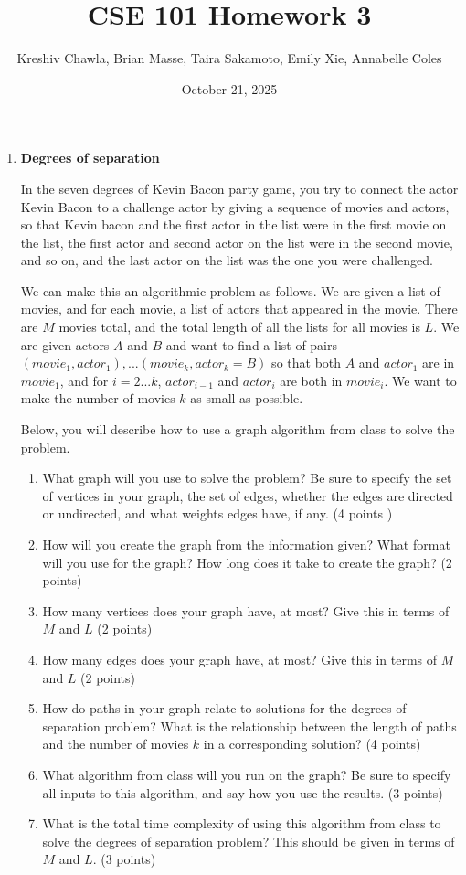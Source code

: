 \documentclass[12pt, letterpaper]{article}
\title{CSE 101 Homework 3}
\author{Kreshiv Chawla, Brian Masse, Taira Sakamoto, Emily Xie, Annabelle Coles}
\date{October 21, 2025}
\begin{document}
\maketitle
\newpage

\begin{enumerate}

\item \textbf{Degrees of separation}

In the seven degrees of Kevin Bacon party game, you try to connect the actor Kevin Bacon to a challenge actor by giving a sequence of movies and actors, so that Kevin bacon and the first actor in the list were in the first movie on the list, the first actor and second actor on the list were in the second movie, and so on, and the last actor on the list was the one you were challenged. 

We can make this an algorithmic problem as follows.
We are given a list of movies, and for each movie, a list of actors that
appeared in the movie.  There are $M$ movies total, and the total length of all the lists for all movies is $L$. We are given actors $A$ and $B$ and want to find a list of pairs $(movie_1,actor_1),...(movie_k,actor_k=B)$ so that
both $A$ and $actor_1$ are in $movie_1$, and for
$i=2...k$, $actor_{i-1}$ and $actor_i$ are
both in $movie_i$.  We want to make the number of movies $k$ as small as possible.  

Below, you will describe how to use a graph algorithm from class to solve the
problem.
\begin{enumerate}
\item  What graph will you use to solve the problem?  Be sure to specify the set of vertices in your graph, the set of edges, whether the edges are directed or undirected, and what weights edges have, if any.  
(4 points )
\item How will you create the graph from the information given?  What format will you use for the graph?  How long does it take to create the graph?
(2 points)
\item How many vertices does your graph have, at most? Give this in terms of $M$ and $L$ 
(2 points)
\item How many edges does your graph have, at most? Give this in terms of $M$ and $L$ 
(2 points)
\item  How do paths in your graph relate to solutions for the degrees of separation problem?  What is the relationship between the length of paths and the number of movies $k$ in a corresponding solution?
(4 points)
\item What algorithm from class will you run on the graph?
Be sure to specify all inputs to this algorithm, and say how you use the results.
(3 points)
\item What is the total time complexity of using this algorithm from class to solve the degrees of separation problem?  This should be given in terms of $M$ and $L$.
(3 points)
\end{enumerate}



\end{enumerate}
\end{document}
